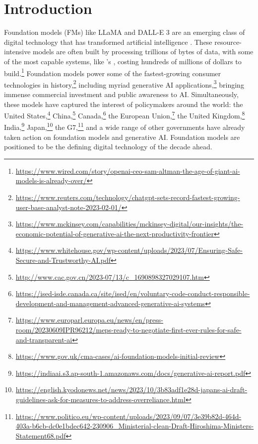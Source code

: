 \hypertarget{introduction}{\section{Introduction}}
\label{sec:introduction}
Foundation models (FMs) like LLaMA and DALL-E 3 are an emerging class of digital technology that has transformed artificial intelligence \citep{bommasani2021opportunities}. 
These resource-intensive models are often built by processing trillions of bytes of data, with some of the most capable systems, like \openai's \gptfour, costing hundreds of millions of dollars to build.\footnote{\url{https://www.wired.com/story/openai-ceo-sam-altman-the-age-of-giant-ai-models-is-already-over/}} 
Foundation models power some of the fastest-growing consumer technologies in history,\footnote{\url{https://www.reuters.com/technology/chatgpt-sets-record-fastest-growing-user-base-analyst-note-2023-02-01/}}
including myriad generative AI applications,\footnote{\url{https://www.mckinsey.com/capabilities/mckinsey-digital/our-insights/the-economic-potential-of-generative-ai-the-next-productivity-frontier}} bringing immense commercial investment and public awareness to AI. 
Simultaneously, these models have captured the interest of policymakers around the world: the United States,\footnote{\url{https://www.whitehouse.gov/wp-content/uploads/2023/07/Ensuring-Safe-Secure-and-Trustworthy-AI.pdf}                                                   } China,\footnote{\url{http://www.cac.gov.cn/2023-07/13/c_1690898327029107.htm}} Canada,\footnote{\url{https://ised-isde.canada.ca/site/ised/en/voluntary-code-conduct-responsible-development-and-management-advanced-generative-ai-systems}} the European Union,\footnote{\url{https://www.europarl.europa.eu/news/en/press-room/20230609IPR96212/meps-ready-to-negotiate-first-ever-rules-for-safe-and-transparent-ai}} the United Kingdom,\footnote{\url{https://www.gov.uk/cma-cases/ai-foundation-models-initial-review}} India,\footnote{\url{https://indiaai.s3.ap-south-1.amazonaws.com/docs/generative-ai-report.pdf}} Japan,\footnote{\url{https://english.kyodonews.net/news/2023/10/3b83adf1e28d-japans-ai-draft-guidelines-ask-for-measures-to-address-overreliance.html}} the G7,\footnote{\url{https://www.politico.eu/wp-content/uploads/2023/09/07/3e39b82d-464d-403a-b6cb-dc0e1bdec642-230906_Ministerial-clean-Draft-Hiroshima-Ministers-Statement68.pdf}} and a wide range of other governments have already taken action on foundation models and generative AI.
Foundation models are positioned to be the defining digital technology of the decade ahead.

